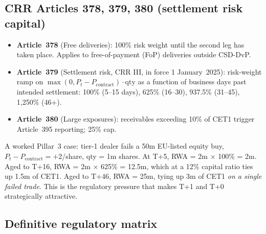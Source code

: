 \documentclass[11pt,a4paper]{article}
\begin{document}
\subsection{CRR Articles 378, 379, 380 (settlement risk capital)}
\label{sec:accounting-crr}

\begin{itemize}[nosep]
\item \textbf{Article~378} (Free deliveries): 100\% risk weight until the second leg has taken place. Applies to free-of-payment (FoP) deliveries outside CSD-DvP.
\item \textbf{Article~379} (Settlement risk, CRR III, in force 1 January~2025): risk-weight ramp on $\max(0, P_t - P_{\mathrm{contract}}) \cdot \mathrm{qty}$ as a function of business days past intended settlement: 100\% (5--15 days), 625\% (16--30), 937.5\% (31--45), 1{,}250\% (46+).
\item \textbf{Article~380} (Large exposures): receivables exceeding 10\% of CET1 trigger Article~395 reporting; 25\% cap.
\end{itemize}

A worked Pillar~3 case: tier-1 dealer fails a \texteuro{}50m EU-listed equity buy, $P_t - P_{\mathrm{contract}} = +$\texteuro{}2/share, qty = 1m shares. At T+5, RWA = \texteuro{}2m $\times$ 100\% = \texteuro{}2m. Aged to T+16, RWA = \texteuro{}2m $\times$ 625\% = \texteuro{}12.5m, which at a 12\% capital ratio ties up \texteuro{}1.5m of CET1. Aged to T+46, RWA = \texteuro{}25m, tying up \texteuro{}3m of CET1 \emph{on a single failed trade}. This is the regulatory pressure that makes T+1 and T+0 strategically attractive.

\subsection{Definitive regulatory matrix}
\label{sec:accounting-regulatory}
\end{document}
